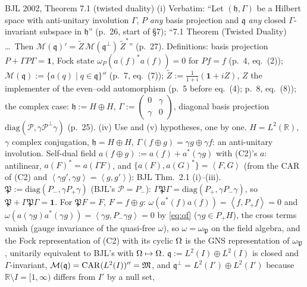 \documentclass[11pt]{article}
\newcommand{\Pp}{P_+}\newcommand{\Pm}{P_-}
\newcommand{\CAR}{\operatorname{CAR}}\newcommand{\Stwo}{\mathfrak S_2}\newcommand{\Sone}{\mathfrak S_1}
\newcommand{\ip}[2]{\left\langle #1,#2\right\rangle}\newcommand{\one}{\mathbf 1}
\begin{document}
\begin{citedbox}{BJL 2002, Theorem 7.1 (twisted duality)}
(i) Verbatim: ``Let $(\mathfrak h,\Gamma)$ be a Hilbert space with anti-unitary involution $\Gamma$, $P$ \emph{any}
basis projection and $\mathfrak q$ \emph{any} closed $\Gamma$-invariant subspace in $\mathfrak h$'' (p.~26, start of
\S7); ``7.1 Theorem (Twisted Duality) \dots\ Then $\mathcal M(\mathfrak q)'=\widetilde Z\,\mathcal M(\mathfrak q^\perp)\,
\widetilde Z^*$'' (p.~27).  Definitions: basis projection $P+\Gamma P\Gamma=\one$, Fock state $\omega_P(a(f)^*a(f))=0$
for $Pf=f$ (p.~4, eq.~(2)); $\mathcal M(\mathfrak q):=\{a(q)\mid q\in\mathfrak q\}''$ (p.~7, eq.~(7));
$\widetilde Z:=\frac1{1+i}(\one+iZ)$, $Z$ the implementer of the even--odd automorphism (p.~5 before eq.~(4); p.~8,
eq.~(8)); the complex case: $\mathfrak h:=H\oplus H$, $\Gamma:=\begin{pmatrix}0&\gamma\\\gamma&0\end{pmatrix}$,
diagonal basis projection $\mathrm{diag}(\mathcal P,\gamma\mathcal P^\perp\gamma)$ (p.~25).
(iv) Use and (v) hypotheses, one by one.  $H=L^2(\mathbb R)$, $\gamma$ complex conjugation, $\mathfrak h=H\oplus H$,
$\Gamma(f\oplus g)=\gamma g\oplus\gamma f$: an anti-unitary involution.  Self-dual field
$a(f\oplus g):=a(f)+a^*(\gamma g)$ with (C2)'s $a$: antilinear, $a(F)^*=a(\Gamma F)$, and
$\{a(F),a(G)^*\}=\ip FG$ (from the CAR of (C2) and $\ip{\gamma g'}{\gamma g}=\ip g{g'}$): BJL Thm.~2.1 (i)--(iii).
$\mathfrak P:=\mathrm{diag}(\Pm,\gamma\Pp\gamma)$ (BJL's $\mathcal P=\Pm$): $\Gamma\mathfrak P\Gamma=
\mathrm{diag}(\Pp,\gamma\Pm\gamma)$, so $\mathfrak P+\Gamma\mathfrak P\Gamma=\one$.  For $\mathfrak PF=F$,
$F=f\oplus g$: $\omega(a^*(f)a(f))=\ip f{\Pp f}=0$ and $\omega(a(\gamma g)a^*(\gamma g))=\ip{\gamma g}{\Pm\gamma g}=0$
by \eqref{eq:qf} ($\gamma g\in\Pp H$), the cross terms vanish (gauge invariance of the quasi-free $\omega$), so
$\omega=\omega_{\mathfrak P}$ on the field algebra, and the Fock representation of (C2) with its cyclic $\Omega$ is the GNS
representation of $\omega_{\mathfrak P}$, unitarily equivalent to BJL's with $\Omega\mapsto\Omega$.
$\mathfrak q:=L^2(I)\oplus L^2(I)$ is closed and $\Gamma$-invariant, $\mathcal M(\mathfrak q)=\CAR(L^2(I))''=\cM$, and
$\mathfrak q^\perp=L^2(I')\oplus L^2(I')$ because $\mathbb R\setminus I=[1,\infty)$ differs from $I'$ by a null set,

\end{citedbox}
\end{document}
